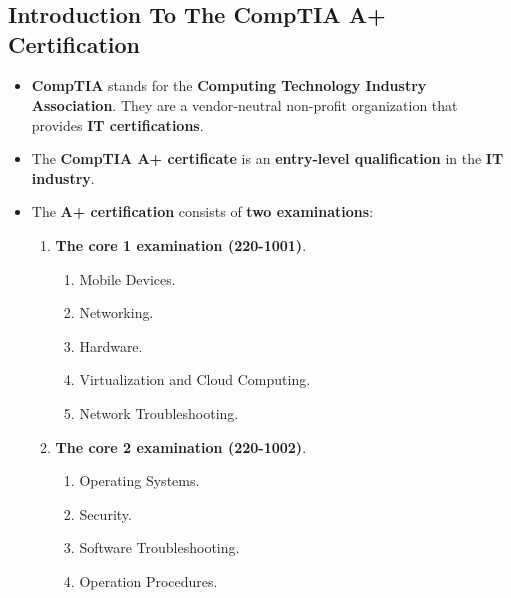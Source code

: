 \documentclass{article}
\begin{document}
    \section*{}

    \subsection*{Introduction To The CompTIA A+ Certification}
    \begin{itemize}
        \item \textbf{CompTIA} stands for the \textbf{Computing Technology Industry Association}. They are a vendor-neutral non-profit organization that provides \textbf{IT certifications}.
        \item The \textbf{CompTIA A+ certificate} is an \textbf{entry-level qualification} in the \textbf{IT industry}.
        \item The \textbf{A+ certification} consists of \textbf{two examinations}:
        \begin{enumerate}
            \item \textbf{The core 1 examination (220-1001)}.
            \begin{enumerate}
                \item Mobile Devices.
                \item Networking.
                \item Hardware.
                \item Virtualization and Cloud Computing.
                \item Network Troubleshooting.
            \end{enumerate}
            \item \textbf{The core 2 examination (220-1002)}.
            \begin{enumerate}
                \item Operating Systems.
                \item Security.
                \item Software Troubleshooting.
                \item Operation Procedures.
            \end{enumerate}
        \end{enumerate}
    \end{itemize}

    \section*{}
\end{document}
